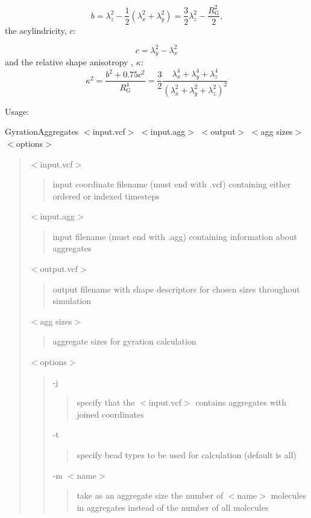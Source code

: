 \begin{equation}
  b = \lambda_z^2 - \frac{1}{2} \left( \lambda_x^2 + \lambda_y^2 \right) = \frac{3}{2} \lambda_z^2 - \frac{R_{\mathrm{G}}^2}{2} \mbox{,}
\end{equation}
 the acylindricity, $c$:

\begin{equation}
  c = \lambda_y^2 - \lambda_x^2
\end{equation}
 and the relative shape anisotropy , $\kappa$:
\begin{equation}
  \kappa^2 = \frac{b^2 + 0.75 c^2}{R_{\mathrm{G}}^4} = \frac{3}{2}
  \frac{\lambda_x^4 + \lambda_y^4 + \lambda_z^4}{\left( \lambda_x^2 +
  \lambda_y^2 + \lambda_z^2 \right)^2}
\end{equation}


Usage\+:

{\ttfamily Gyration\+Aggregates $<$input.\+vcf$>$ $<$input.\+agg$>$ $<$output$>$ $<$agg sizes$>$ $<$options$>$}

\begin{quote}
{\ttfamily $<$input.\+vcf$>$} \begin{quote}
input coordinate filename (must end with {\ttfamily .vcf}) containing either ordered or indexed timesteps \end{quote}
{\ttfamily $<$input.\+agg$>$} \begin{quote}
input filename (must end with {\ttfamily .agg}) containing information about aggregates \end{quote}
{\ttfamily $<$output.\+vcf$>$} \begin{quote}
output filename with shape descriptors for chosen sizes throughout simulation \end{quote}
{\ttfamily $<$agg sizes$>$} \begin{quote}
aggregate sizes for gyration calculation \end{quote}
{\ttfamily $<$options$>$} \begin{quote}
{\ttfamily -\/j} \begin{quote}
specify that the {\ttfamily $<$input.\+vcf$>$} contains aggregates with joined coordinates \end{quote}
{\ttfamily -\/t} \begin{quote}
specify bead types to be used for calculation (default is all) \end{quote}
{\ttfamily -\/m $<$name$>$} \begin{quote}
take as an aggregate size the number of {\ttfamily $<$name$>$} molecules in aggregates instead of the number of all molecules \end{quote}
\end{quote}
\end{quote}


